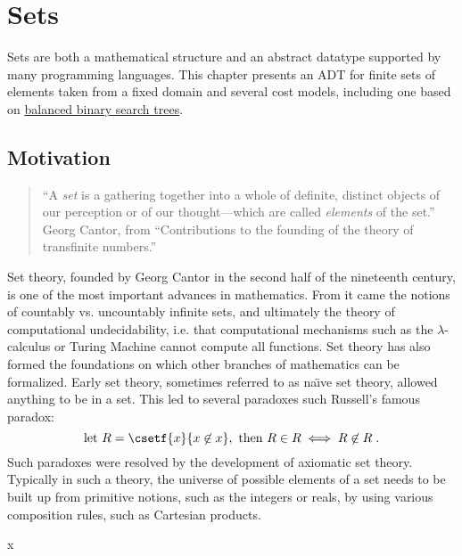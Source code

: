 \chapter{Sets}
\label{XXch:sets}

\begin{preamble}
  Sets are both a mathematical structure and an abstract datatype
  supported by many programming languages.  This chapter presents an ADT for
  finite sets of elements taken from a fixed domain and several cost models, including one based on \href{ch:bst::adt}{balanced binary search trees}.

\end{preamble}


\section{Motivation}
\label{XXsec:sets::math}


\begin{gram}
\begin{quote}
``A \emph{set} is a gathering together into a whole of definite, distinct
objects of our perception or of our thought---which are called \emph{elements}
of the set.''\\[.1in] Georg Cantor, from ``Contributions to the founding of the theory of transfinite numbers.''
\end{quote}

Set theory, founded by Georg Cantor in the second half of the
nineteenth century, is one of the most important advances in
mathematics.  From it came the notions of countably vs. uncountably
infinite sets, and ultimately the theory of computational
undecidability, i.e. that computational mechanisms such as the
$\lambda$-calculus or Turing Machine cannot compute all functions.
Set theory has also formed the foundations on which other branches of
mathematics can be formalized.  Early set theory, sometimes referred
to as na\"{\i}ve set theory, allowed anything to be in a set.  This
led to several paradoxes such Russell's famous paradox:
  \[\mbox{let } R = \csetf{x}{x \not\in x}, \mbox{ then } R \in R \iff R \not\in R
\;.\] Such paradoxes were resolved by the development of axiomatic set
theory.  Typically in such a theory, the universe of possible elements
of a set needs to be built up from primitive notions, such as the
integers or reals, by using various composition rules, such as
Cartesian products.
\end{gram}
\begin{gram}
x
\end{gram}

